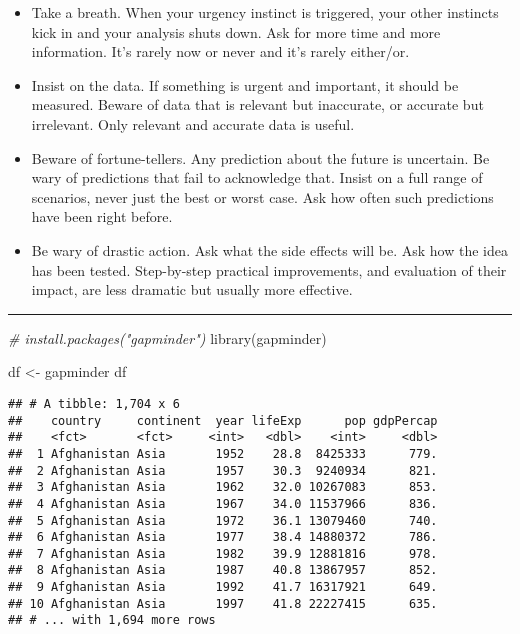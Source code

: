 \documentclass[
]{article}
\newenvironment{Shaded}{\begin{snugshade}}{\end{snugshade}}
\newcommand{\CommentTok}[1]{\textcolor[rgb]{0.56,0.35,0.01}{\textit{#1}}}
\newcommand{\FunctionTok}[1]{\textcolor[rgb]{0.00,0.00,0.00}{#1}}
\newcommand{\NormalTok}[1]{#1}
\newcommand{\OtherTok}[1]{\textcolor[rgb]{0.56,0.35,0.01}{#1}}
\providecommand{\tightlist}{%
  \setlength{\itemsep}{0pt}\setlength{\parskip}{0pt}}
\begin{document}
\begin{itemize}
\tightlist
\item
  Take a breath. When your urgency instinct is triggered, your other
  instincts kick in and your analysis shuts down. Ask for more time and
  more information. It's rarely now or never and it's rarely either/or.
\item
  Insist on the data. If something is urgent and important, it should be
  measured. Beware of data that is relevant but inaccurate, or accurate
  but irrelevant. Only relevant and accurate data is useful.
\item
  Beware of fortune-tellers. Any prediction about the future is
  uncertain. Be wary of predictions that fail to acknowledge that.
  Insist on a full range of scenarios, never just the best or worst
  case. Ask how often such predictions have been right before.
\item
  Be wary of drastic action. Ask what the side effects will be. Ask how
  the idea has been tested. Step-by-step practical improvements, and
  evaluation of their impact, are less dramatic but usually more
  effective.
\end{itemize}

\begin{center}\rule{0.5\linewidth}{0.5pt}\end{center}

\begin{Shaded}
\begin{Highlighting}[]
\CommentTok{\# install.packages("gapminder")}
\FunctionTok{library}\NormalTok{(gapminder)}
\end{Highlighting}
\end{Shaded}

\begin{Shaded}
\begin{Highlighting}[]
\NormalTok{df }\OtherTok{\textless{}{-}}\NormalTok{ gapminder}
\NormalTok{df}
\end{Highlighting}
\end{Shaded}

\begin{verbatim}
## # A tibble: 1,704 x 6
##    country     continent  year lifeExp      pop gdpPercap
##    <fct>       <fct>     <int>   <dbl>    <int>     <dbl>
##  1 Afghanistan Asia       1952    28.8  8425333      779.
##  2 Afghanistan Asia       1957    30.3  9240934      821.
##  3 Afghanistan Asia       1962    32.0 10267083      853.
##  4 Afghanistan Asia       1967    34.0 11537966      836.
##  5 Afghanistan Asia       1972    36.1 13079460      740.
##  6 Afghanistan Asia       1977    38.4 14880372      786.
##  7 Afghanistan Asia       1982    39.9 12881816      978.
##  8 Afghanistan Asia       1987    40.8 13867957      852.
##  9 Afghanistan Asia       1992    41.7 16317921      649.
## 10 Afghanistan Asia       1997    41.8 22227415      635.
## # ... with 1,694 more rows
\end{verbatim}
\end{document}
